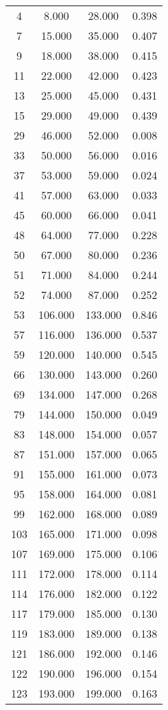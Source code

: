 % 
\begin{tabular}{cccc}
  \hline
  \hline
4 & 8.000 & 28.000 & 0.398 \\ 
  7 & 15.000 & 35.000 & 0.407 \\ 
  9 & 18.000 & 38.000 & 0.415 \\ 
  11 & 22.000 & 42.000 & 0.423 \\ 
  13 & 25.000 & 45.000 & 0.431 \\ 
  15 & 29.000 & 49.000 & 0.439 \\ 
  29 & 46.000 & 52.000 & 0.008 \\ 
  33 & 50.000 & 56.000 & 0.016 \\ 
  37 & 53.000 & 59.000 & 0.024 \\ 
  41 & 57.000 & 63.000 & 0.033 \\ 
  45 & 60.000 & 66.000 & 0.041 \\ 
  48 & 64.000 & 77.000 & 0.228 \\ 
  50 & 67.000 & 80.000 & 0.236 \\ 
  51 & 71.000 & 84.000 & 0.244 \\ 
  52 & 74.000 & 87.000 & 0.252 \\ 
  53 & 106.000 & 133.000 & 0.846 \\ 
  57 & 116.000 & 136.000 & 0.537 \\ 
  59 & 120.000 & 140.000 & 0.545 \\ 
  66 & 130.000 & 143.000 & 0.260 \\ 
  69 & 134.000 & 147.000 & 0.268 \\ 
  79 & 144.000 & 150.000 & 0.049 \\ 
  83 & 148.000 & 154.000 & 0.057 \\ 
  87 & 151.000 & 157.000 & 0.065 \\ 
  91 & 155.000 & 161.000 & 0.073 \\ 
  95 & 158.000 & 164.000 & 0.081 \\ 
  99 & 162.000 & 168.000 & 0.089 \\ 
  103 & 165.000 & 171.000 & 0.098 \\ 
  107 & 169.000 & 175.000 & 0.106 \\ 
  111 & 172.000 & 178.000 & 0.114 \\ 
  114 & 176.000 & 182.000 & 0.122 \\ 
  117 & 179.000 & 185.000 & 0.130 \\ 
  119 & 183.000 & 189.000 & 0.138 \\ 
  121 & 186.000 & 192.000 & 0.146 \\ 
  122 & 190.000 & 196.000 & 0.154 \\ 
  123 & 193.000 & 199.000 & 0.163 \\ 
   \hline
\end{tabular}
